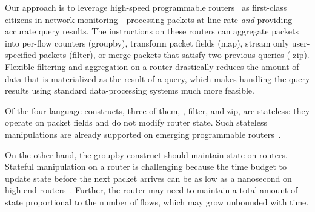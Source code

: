 Our approach is to leverage high-speed programmable routers~\cite{rmt, xpliant,
  tofino, flexpipe} as first-class citizens in network monitoring---processing
packets at line-rate {\em and} providing accurate query results.
The instructions on these routers can aggregate packets into per-flow counters
({\ct groupby}), transform packet fields ({\ct map}), stream only user-specified
packets ({\ct filter}), or merge packets that satisfy two previous queries ({\ct
  zip}). Flexible filtering and aggregation on a router drastically reduces the
amount of data that is materialized as the result of a query, which makes
handling the query results using standard data-processing systems much more
feasible.

Of the four language constructs, three of them, , {\ct filter}, and
{\ct zip}, are stateless: they operate on packet fields and do not modify router
state. Such stateless manipulations are already supported on emerging
programmable routers~\cite{rmt, xpliant, flexpipe, tofino}.

On the other hand, the {\ct groupby} construct should maintain state on routers.
Stateful manipulation on a router is challenging because the time budget to
update state before the next packet arrives can be as low as a nanosecond on
high-end routers~\cite{domino_sigcomm}.  Further, the router may need to
maintain a total amount of state proportional to the number of flows, which may
grow unbounded with time.

